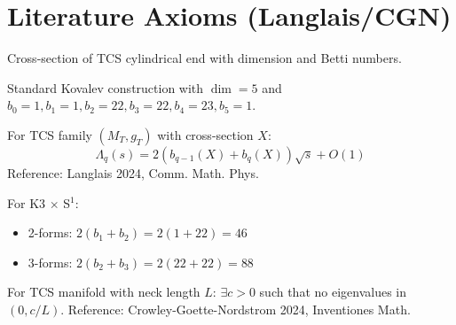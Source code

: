 \section{Literature Axioms (Langlais/CGN)}

\begin{definition}\label{def:CrossSection}
    \leanok
    Cross-section of TCS cylindrical end with dimension and Betti numbers.
\end{definition}

\begin{definition}\label{def:K3_S1}
    \leanok
    Standard Kovalev construction with $\dim = 5$ and
    $b_0 = 1, b_1 = 1, b_2 = 22, b_3 = 22, b_4 = 23, b_5 = 1$.
\end{definition}

\begin{theorem}\label{thm:langlais}
    For TCS family $(M_T, g_T)$ with cross-section $X$:
    \[
        \Lambda_q(s) = 2(b_{q-1}(X) + b_q(X))\sqrt{s} + O(1)
    \]
    Reference: Langlais 2024, Comm. Math. Phys.
\end{theorem}

\begin{theorem}\label{thm:K3_S1_density}
    \leanok
    For K3 $\times$ S$^1$:
    \begin{itemize}
        \item 2-forms: $2(b_1 + b_2) = 2(1 + 22) = 46$
        \item 3-forms: $2(b_2 + b_3) = 2(22 + 22) = 88$
    \end{itemize}
\end{theorem}

\begin{theorem}\label{thm:cgn_no_small}
    For TCS manifold with neck length $L$:
    $\exists c > 0$ such that no eigenvalues in $(0, c/L)$.
    Reference: Crowley-Goette-Nordstrom 2024, Inventiones Math.
\end{theorem}


